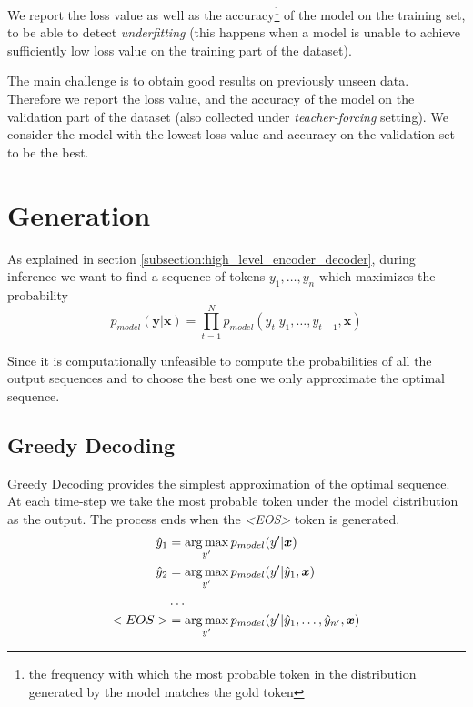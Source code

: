 We report the loss value as well as the accuracy\footnote{the frequency with which the most probable token in the distribution generated by the model matches the gold token} of the model on the training set, to be able to detect \emph{underfitting} (this happens when a model is unable to achieve sufficiently low loss value on the training part of the dataset).

The main challenge is to obtain good results on previously unseen data. Therefore we report the loss value, and the accuracy of the model on the validation part of the dataset (also collected under \emph{teacher-forcing} setting). We consider the model with the lowest loss value and accuracy on the validation set to be the best.

\section{Generation} \label{section:generation}

As explained in section \ref{subsection:high_level_encoder_decoder}, during inference we want to find a sequence of tokens $y_1,\dots,y_n$ which maximizes the probability
\begin{equation}
    p_{model}(\boldsymbol{y} | \boldsymbol{x}) = \prod_{t=1}^N{p_{model}(y_t|y_1,\dots,y_{t-1}, \boldsymbol{x})}
\end{equation}

Since it is computationally  unfeasible to compute the probabilities of all the output sequences and to choose the best one we only approximate the optimal sequence.

\subsection{Greedy Decoding}

Greedy Decoding provides the simplest approximation of the optimal sequence. At each time-step we take the most probable token under the model distribution as the output. The process ends when the \emph{\textless EOS\textgreater} token is generated.
\begin{align*}
    \hat{y}_1 &= \operatorname*{arg\,max}_{y'}{p_{model}(y' | \boldsymbol{x})} \\
    \hat{y}_2 &= \operatorname*{arg\,max}_{y'}{p_{model}(y' | \hat{y}_1, \boldsymbol{x})} \\
    &\dots \\
    <EOS> &= \operatorname*{arg\,max}_{y'}{p_{model}(y' | \hat{y}_1,\dots,\hat{y}_{n'}, \boldsymbol{x})}
\end{align*}


